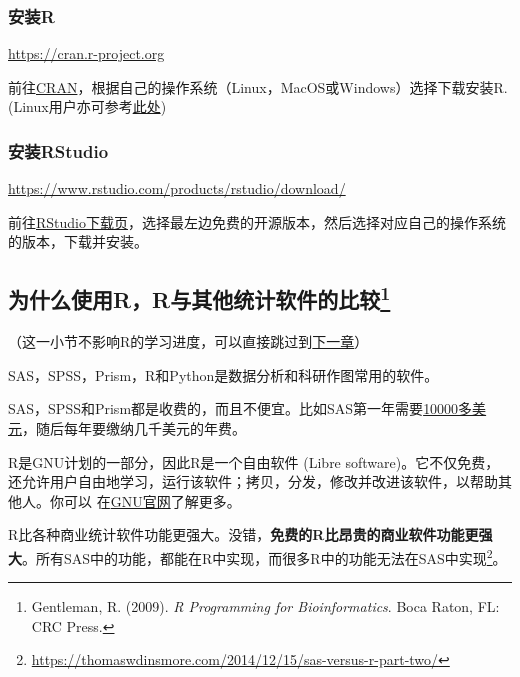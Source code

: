 \documentclass[]{book}
\let\rmarkdownfootnote\footnote%
\def\footnote{\protect\rmarkdownfootnote}
\begin{document}
\hypertarget{R-install}{%
\subsubsection{安装R}\label{R-install}}

\url{https://cran.r-project.org}

前往\href{https://cran.r-project.org}{CRAN}，根据自己的操作系统（Linux，MacOS或Windows）选择下载安装R. (Linux用户亦可参考\href{https://blog.zenggyu.com/en/post/2018-01-29/installing-r-r-packages-e-g-tidyverse-and-rstudio-on-ubuntu-linux/}{此处})

\hypertarget{RStudio-install}{%
\subsubsection{安装RStudio}\label{RStudio-install}}

\url{https://www.rstudio.com/products/rstudio/download/}

前往\href{https://www.rstudio.com/products/rstudio/download/}{RStudio下载页}，选择最左边免费的开源版本，然后选择对应自己的操作系统的版本，下载并安装。

\hypertarget{youshi}{%
\subsection[为什么使用R，R与其他统计软件的比较]{\texorpdfstring{为什么使用R，R与其他统计软件的比较\footnote{Gentleman, R. (2009). \emph{R Programming for Bioinformatics}. Boca Raton, FL: CRC Press.}}{为什么使用R，R与其他统计软件的比较}}\label{youshi}}

（这一小节不影响R的学习进度，可以直接跳过到\protect\hyperlink{getting-help}{下一章}）

SAS，SPSS，Prism，R和Python是数据分析和科研作图常用的软件。

SAS，SPSS和Prism都是收费的，而且不便宜。比如SAS第一年需要\href{http://www.sas.com/store/products-solutions/cSoftware-p1.html}{10000多美元}，随后每年要缴纳几千美元的年费。

R是GNU计划的一部分，因此R是一个自由软件 (Libre software)。它不仅免费，还允许用户自由地学习，运行该软件；拷贝，分发，修改并改进该软件，以帮助其他人。你可以 在\href{https://www.gnu.org/philosophy/free-sw.zh-cn.html}{GNU官网}了解更多。

R比各种商业统计软件功能更强大。没错，\textbf{免费的R比昂贵的商业软件功能更强大}。所有SAS中的功能，都能在R中实现，而很多R中的功能无法在SAS中实现\footnote{\url{https://thomaswdinsmore.com/2014/12/15/sas-versus-r-part-two/}}。
\end{document}
